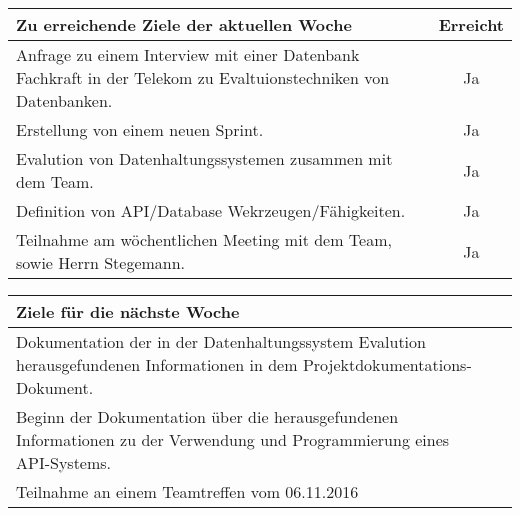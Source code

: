 \begin{tabularx}{\textwidth}{Xc}
    \arrayrulecolor{OliveGreen}
    \toprule
    {\bfseries Zu erreichende Ziele der aktuellen Woche} & {\bfseries Erreicht} \\
    \midrule[2pt]
    Anfrage zu einem Interview mit einer Datenbank Fachkraft in der
    Telekom zu Evaltuionstechniken von Datenbanken.  & Ja  \\
    \rowcolor{OliveGreen!15}
    Erstellung von einem neuen Sprint.  & Ja  \\
    \rowcolor{White}
    Evalution von Datenhaltungssystemen zusammen mit dem Team.  & Ja  \\
    \rowcolor{OliveGreen!15}
    Definition von API/Database Wekrzeugen/Fähigkeiten.  & Ja  \\
    \rowcolor{White}
    Teilnahme am wöchentlichen Meeting mit dem Team, sowie Herrn
    Stegemann.  & Ja \\
    \bottomrule[2pt]
\end{tabularx}
%
\vspace{1cm}
%
\begin{tabularx}{\textwidth}{Xc}
    \arrayrulecolor{OliveGreen}
    \toprule
    {\bfseries Ziele für die nächste Woche}              &                      \\
    \midrule[2pt]
    Dokumentation der in der Datenhaltungssystem Evalution
    herausgefundenen Informationen in dem 
    Projektdokumentations-Dokument.  & \\
    \rowcolor{OliveGreen!15}
    Beginn der Dokumentation über die herausgefundenen Informationen
    zu der Verwendung und Programmierung eines API-Systems.  &  \\
    \rowcolor{White}
    Teilnahme an einem Teamtreffen vom 06.11.2016  &  \\
\end{tabularx}

